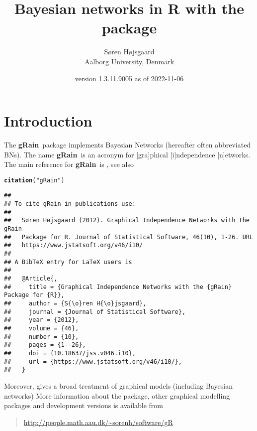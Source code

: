 \documentclass[10pt]{article}\usepackage[]{graphicx}\usepackage[]{xcolor}
\author{S{\o}ren H{\o}jsgaard\\Aalborg University, Denmark}
\title{Bayesian networks in R with the \pkg{gRain} package}
\date{\pkg{gRain} version 1.3.11.9005 as of 2022-11-06}
\makeatletter
\newcommand{\hlstr}[1]{\textcolor[rgb]{0.192,0.494,0.8}{#1}}%
\newcommand{\hlstd}[1]{\textcolor[rgb]{0.345,0.345,0.345}{#1}}%
\newcommand{\hlkwd}[1]{\textcolor[rgb]{0.737,0.353,0.396}{\textbf{#1}}}%
\newenvironment{kframe}{%
 \def\at@end@of@kframe{}%
 \ifinner\ifhmode%
  \def\at@end@of@kframe{\end{minipage}}%
  \begin{minipage}{\columnwidth}%
 \fi\fi%
 \def\FrameCommand##1{\hskip\@totalleftmargin \hskip-\fboxsep
 \colorbox{shadecolor}{##1}\hskip-\fboxsep
     \hskip-\linewidth \hskip-\@totalleftmargin \hskip\columnwidth}%
 \MakeFramed {\advance\hsize-\width
   \@totalleftmargin\z@ \linewidth\hsize
   \@setminipage}}%
 {\par\unskip\endMakeFramed%
 \at@end@of@kframe}
\newenvironment{knitrout}{}{} %
\def\grbn{{\bf gRain}}
\makeatother
\begin{document}
\maketitle
\tableofcontents
\parindent0pt\parskip5pt

\section{Introduction}

The \grbn\ package implements Bayesian Networks (hereafter often
abbreviated BNs). The name \grbn\ is an acronym for [gra]phical
[i]ndependence [n]etworks. The main reference for \grbn\  is
\cite{hoj:12}, see also

\begin{knitrout}
\color{fgcolor}\begin{kframe}
\begin{alltt}
\hlkwd{citation}\hlstd{(}\hlstr{"gRain"}\hlstd{)}
\end{alltt}
\begin{verbatim}
## 
## To cite gRain in publications use:
## 
##   Søren Højsgaard (2012). Graphical Independence Networks with the gRain
##   Package for R. Journal of Statistical Software, 46(10), 1-26. URL
##   https://www.jstatsoft.org/v46/i10/
## 
## A BibTeX entry for LaTeX users is
## 
##   @Article{,
##     title = {Graphical Independence Networks with the {gRain} Package for {R}},
##     author = {S{\o}ren H{\o}jsgaard},
##     journal = {Journal of Statistical Software},
##     year = {2012},
##     volume = {46},
##     number = {10},
##     pages = {1--26},
##     doi = {10.18637/jss.v046.i10},
##     url = {https://www.jstatsoft.org/v46/i10/},
##   }
\end{verbatim}
\end{kframe}
\end{knitrout}

Moreover, \cite{hoj:edw:lau:12} gives a broad treatment of graphical
models (including Bayesian networks) More information about the
package, other graphical modelling packages and development versions
is available from

\begin{quote}
\url{http://people.math.aau.dk/~sorenh/software/gR}
\end{quote}

\end{document}
